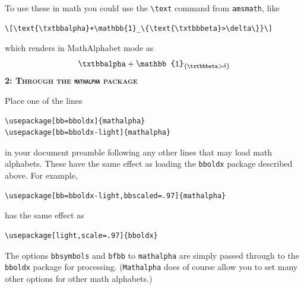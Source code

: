 \documentclass[11pt]{amsart}
\begin{document}
To use these in math you could use the \verb|\text| command from {\tt amsmath}, like
\begin{verbatim}
\[\text{\txtbbalpha}+\mathbb{1}_\{\text{\txtbbbeta}>\delta\}}\]
\end{verbatim}
which renders in MathAlphabet mode as
\[\text{\txtbbalpha}+\mathbb{1}_{\{\text{\txtbbbeta}>\delta\}}\]
\textbf{\textsc{2: Through the {\tt mathalpha} package}}


Place one of the lines
\begin{verbatim}
\usepackage[bb=bboldx]{mathalpha}
\usepackage[bb=bboldx-light]{mathalpha}
\end{verbatim}
in your document preamble following any other lines that may load math alphabets. These have the same effect  as loading the {\tt bboldx} package described above. For example,
\begin{verbatim}
\usepackage[bb=bboldx-light,bbscaled=.97]{mathalpha}
\end{verbatim}
has the same effect as
\begin{verbatim}
\usepackage[light,scale=.97]{bboldx} 
\end{verbatim}
The options {\tt bbsymbols} and {\tt bfbb} to {\tt mathalpha} are simply passed through to the {\tt bboldx} package for processing.
({\tt Mathalpha} does of course allow you to set many other options for other math alphabets.)
\end{document}
